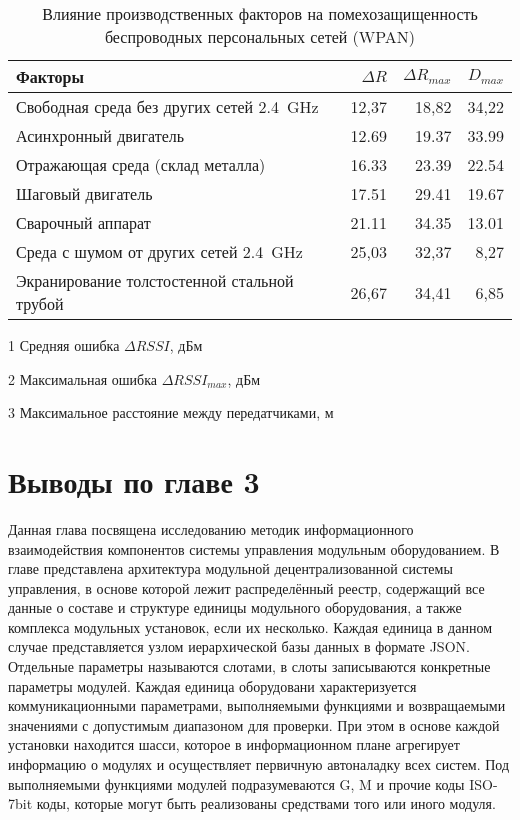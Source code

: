 \begin{table}[!htb]
\centering
\caption{Влияние производственных факторов на помехозащищенность беспроводных персональных сетей (WPAN)} \vspace{4pt}
\label{tab-2}
\begin{threeparttable}
\begin{tabularx}{\linewidth}{@{} lrrr}
	\toprule
	\textbf{Факторы} &
	{\small $\Delta R$} \tnote{1} &
	{\small $\Delta R_{max}$} \tnote{2} &
	{\small $D_{max}$} \tnote{3} \\
	\midrule
	Свободная среда без других сетей \SI{2,4}{\giga\hertz} & 12,37 & 18,82 & 34,22 \\
	Асинхронный двигатель & 12.69 & 19.37 & 33.99 \\
	Отражающая среда (склад металла) & 16.33 & 23.39 & 22.54 \\
	Шаговый двигатель & 17.51 & 29.41 & 19.67 \\
	Сварочный аппарат & 21.11 & 34.35 & 13.01 \\
	Среда с шумом от других сетей \SI{2,4}{\giga\hertz} & 25,03 & 32,37 & 8,27 \\
	Экранирование толстостенной стальной трубой & 26,67 & 34,41 & 6,85 \\
	\bottomrule
\end{tabularx}
\begin{tablenotes} \footnotesize
	\item [1] Средняя ошибка $\Delta RSSI$, дБм
	\item [2] Максимальная ошибка $\Delta RSSI_{max}$, дБм
	\item [3] Максимальное расстояние между передатчиками, м
\end{tablenotes}
\end{threeparttable}
\end{table}

\section{Выводы по главе 3}

Данная глава посвящена исследованию методик информационного взаимодействия компонентов системы управления модульным оборудованием. В главе представлена архитектура модульной децентрализованной системы управления, в основе которой лежит распределённый реестр, содержащий все данные о составе и структуре единицы модульного оборудования, а также комплекса модульных установок, если их несколько. Каждая единица в данном случае представляется узлом иерархической базы данных в формате JSON. Отдельные параметры называются слотами, в слоты записываются конкретные параметры модулей. Каждая единица оборудовани характеризуется коммуникационными параметрами, выполняемыми функциями и возвращаемыми значениями с допустимым диапазоном для проверки. При этом в основе каждой установки находится шасси, которое в информационном плане агрегирует информацию о модулях и осуществляет первичную автоналадку всех систем. Под выполняемыми функциями модулей подразумеваются G, M и прочие коды ISO-7bit коды, которые могут быть реализованы средствами того или иного модуля. 

